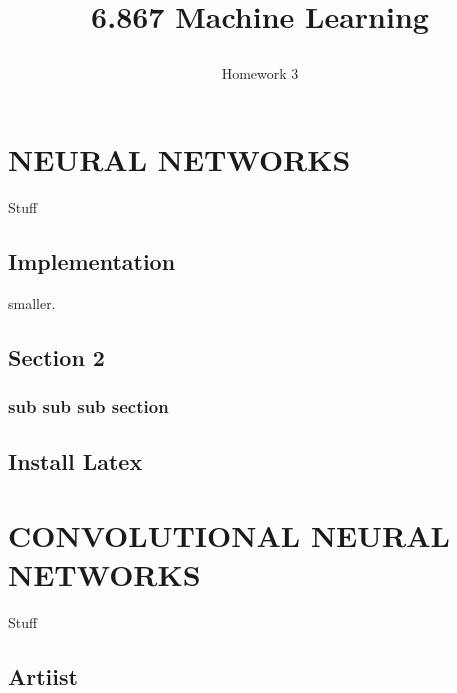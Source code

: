 \documentclass[10pt,twoside]{article}
\begin{document}
\title{6.867 Machine Learning  \subtitle{Homework 3} }

\maketitle


\section{\uppercase{Neural Networks}}

\noindent Stuff


\subsection{Implementation}

\noindent smaller.

\subsection{Section 2}


\subsubsection{sub sub sub section}


\subsection{Install Latex}


\section{\uppercase{Convolutional Neural Networks}}

\noindent Stuff

\subsection{Artiist}
\end{document}
